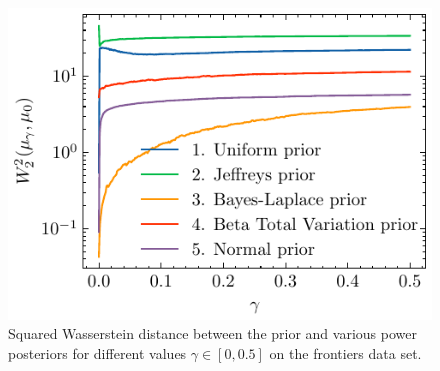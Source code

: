 \documentclass[12pt]{article}
\begin{document}
\begin{figure}[h]
\begin{center}
\includegraphics{imgs/wasser_distskew.pdf}
\end{center}
\caption{Squared Wasserstein distance between the prior and various power posteriors for different values $\gamma \in [0, 0.5]$ on the frontiers data set.}\label{fig:skew_diff_priors}
\end{figure}
\end{document}
